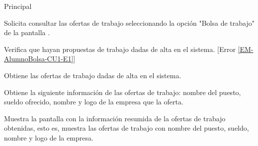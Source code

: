 \begin{UCtrayectoria}{Principal}

	\UCpaso [\UCactor] Solicita consultar las ofertas de trabajo seleccionando la opción "Bolsa de trabajo" de la pantalla . 

	\UCpaso Verifica que hayan propuestas de trabajo dadas de alta en el sistema. [Error \ref{EM-AlumnoBolsa-CU1-E1}]

	\UCpaso Obtiene las ofertas de trabajo dadas de alta en el sistema.

	\UCpaso Obtiene la siguiente información de las ofertas de trabajo: nombre del puesto, sueldo ofrecido, nombre y logo de la empresa que la oferta.

	\UCpaso Muestra la pantalla  con la información resumida de la ofertas de trabajo obtenidas, esto es, muestra las ofertas de trabajo con nombre del puesto, sueldo, nombre y logo de la empresa. 

\end{UCtrayectoria}

